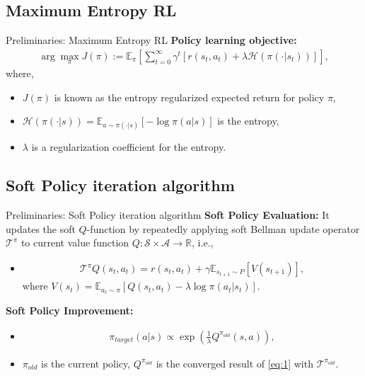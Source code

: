 \documentclass[aspectratio=169,xcolor=dvipsnames]{beamer}
\newcommand{\bE}{\mathbb{E}}
\newcommand{\bR}{\mathbb{R}}
\newcommand{\cS}{\mathcal{S}}
\newcommand{\cA}{\mathcal{A}}
\newcommand{\cH}{\mathcal{H}}
\newcommand{\cT}{\mathcal{T}}
\newcommand{\lm}{\lambda}
\newcommand{\nal}[1]{\begin{align*}#1\end{align*}}
\newcommand{\al}[1]{\begin{align}#1\end{align}}
\begin{document}
\subsection{Maximum Entropy RL}
\begin{frame}{Preliminaries: Maximum Entropy RL}
\textbf{Policy learning objective:} 
\nal{
    \arg\max\limits_{\pi} J(\pi) := \bE_{\pi}\left[\sum\limits_{t=0}^{\infty}\gamma^t[r(s_t,a_t)+\lm \cH(\pi(\cdot|s_t))]\right],
}
where,
\begin{itemize}
\item $J(\pi)$ is known as the entropy regularized expected return for policy $\pi$, 
\item $\cH(\pi(\cdot|s))=\bE_{a\sim \pi(\cdot|s)}[-\log \pi(a|s)]$ is the entropy,
\item $\lm$ is a regularization coefficient for the entropy.
\end{itemize}
\end{frame}

\subsection{Soft Policy iteration algorithm}
\begin{frame}{Preliminaries: Soft Policy iteration algorithm \cite{haarnoja2018soft}}
\textbf{Soft Policy Evaluation:} 
It updates the soft $Q$-function by repeatedly applying soft Bellman
 update operator $\cT^{\pi}$ to current value function $Q: \cS\times\cA\rightarrow \bR$, i.e.,
\begin{itemize}
\item \al{
          \cT^{\pi}Q(s_t,a_t) = r(s_t,a_t) + \gamma \bE_{s_{t+1}\sim P}[V(s_{t+1})], \label{eq:1}
    }
    where $V(s_t)=\bE_{a_t\sim \pi}[Q(s_t,a_t)-\lm \log \pi(a_t|s_t)]$.
\end{itemize}
\textbf{Soft Policy Improvement:} 
\begin{itemize}
    \item 
    \al{
        \pi_{target}(a|s)\propto \exp\left(\frac{1}{\lm}Q^{\pi_{old}}(s,a)\right), \label{eq:2}
        }
    \item $\pi_{old}$ is the current policy, $Q^{\pi_{old}}$ is the converged result of \eqref{eq:1} with $\cT^{\pi_{old}}$.
\end{itemize}
\end{frame}

\end{document}
